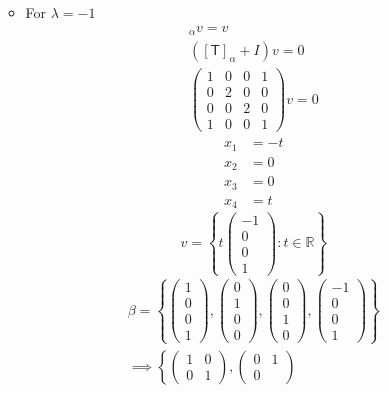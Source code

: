 \begin{enumerate}
\begin{itemize}
\begin{equation}
\end{equation}
\item For $\lambda = -1$
\begin{gather}
[\mathsf{T}]_\alpha v = v\\
([\mathsf{T}]_\alpha + I)v = 0\\
\begin{pmatrix}
1 & 0 & 0 & 1\\
0 & 2 & 0 & 0\\
0 & 0 & 2 & 0\\
1 & 0 & 0 & 1
\end{pmatrix}v = 0
\end{gather}
\begin{align}
x_1 &= -t\\
x_2 &= 0 \\
x_3 &= 0\\
x_4 &= t
\end{align}
\begin{equation}
v = \left\{t\begin{pmatrix}-1\\0\\0\\1\end{pmatrix}\colon t \in \mathbb{R}\right\}
\end{equation}
\begin{gather}
  \beta =
  \left\{\begin{pmatrix}1\\0\\0\\1\end{pmatrix},\begin{pmatrix}0\\1\\0\\0\end{pmatrix},\begin{pmatrix}0\\0\\1\\0\end{pmatrix},\begin{pmatrix}-1\\0\\0\\1\end{pmatrix}\right\}
  \\
\implies \left\{\begin{pmatrix}1 & 0\\0
    &1\end{pmatrix},\begin{pmatrix}0 & 1\\0

\end{pmatrix}
\end{gather}
\end{itemize}
\end{enumerate}

